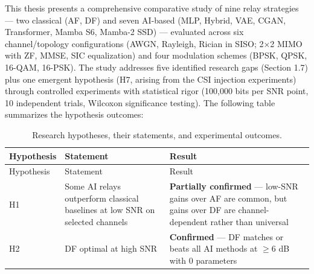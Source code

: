 This thesis presents a comprehensive comparative study of nine relay strategies --- two classical (AF, DF) and seven AI-based (MLP, Hybrid, VAE, CGAN, Transformer, Mamba S6, Mamba-2 SSD) --- evaluated across six channel/topology configurations (AWGN, Rayleigh, Rician in SISO; 2×2 MIMO with ZF, MMSE, SIC equalization) and four modulation schemes (BPSK, QPSK, 16-QAM, 16-PSK). The study addresses five identified research gaps (Section 1.7) plus one emergent hypothesis (H7, arising from the CSI injection experiments) through controlled experiments with statistical rigor (100,000 bits per SNR point, 10 independent trials, Wilcoxon significance testing). The following table summarizes the hypothesis outcomes:

\begin{longtable}[]{@{}
  >{\raggedright\arraybackslash}p{}
  >{\raggedright\arraybackslash}p{}
  >{\raggedright\arraybackslash}p{}@{}}
\caption{Research hypotheses, their statements, and experimental outcomes.}\label{tbl:table33}\tabularnewline
\toprule\noalign{}
\begin{minipage}[b]{\linewidth}\raggedright
Hypothesis
\end{minipage} & \begin{minipage}[b]{\linewidth}\raggedright
Statement
\end{minipage} & \begin{minipage}[b]{\linewidth}\raggedright
Result
\end{minipage} \\
\midrule\noalign{}
\endfirsthead
\toprule\noalign{}
\begin{minipage}[b]{\linewidth}\raggedright
Hypothesis
\end{minipage} & \begin{minipage}[b]{\linewidth}\raggedright
Statement
\end{minipage} & \begin{minipage}[b]{\linewidth}\raggedright
Result
\end{minipage} \\
\midrule\noalign{}
\endhead
\bottomrule\noalign{}
\endlastfoot
H1 & Some AI relays outperform classical baselines at low SNR on selected channels & \textbf{Partially confirmed} --- low-SNR gains over AF are common, but gains over DF are channel-dependent rather than universal \\
H2 & DF optimal at high SNR & \textbf{Confirmed} --- DF matches or beats all AI methods at \(\geq 6\) dB with 0 parameters \\

\end{longtable}
